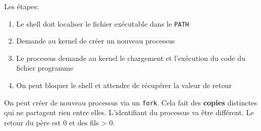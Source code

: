 Les étapes:

\begin{enumerate}
\def\labelenumi{\arabic{enumi}.}
\tightlist
\item
  Le shell doit localiser le fichier exécutable dans le \texttt{PATH}
\item
  Demande au kernel de créer un nouveau processus
\item
  Le processus demande au kernel le chargement et l'exécution du code du
  fichier programme
\item
  On peut bloquer le shell et attendre de récupérer la valeur de retour
\end{enumerate}

On peut créer de nouveau processus via un \texttt{fork}. Cela fait des
\textbf{copies} distinctes qui ne partagent rien entre elles.
L'identifiant du processus va être différent. Le retour du père est 0 et
des fils \textgreater{} 0.

